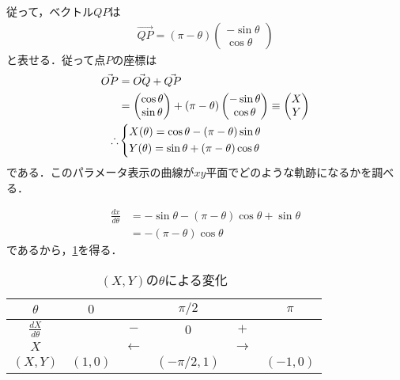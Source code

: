 \documentclass[a4paper,10pt]{ltjsarticle}
\begin{document}
\begin{multicols}{2}
  従って，ベクトル$QP$は
  \begin{align*}
    \vec{QP} = (\pi-\theta)
    \begin{pmatrix}
      -\sin\theta \\
      \cos\theta
    \end{pmatrix}
  \end{align*}
  と表せる．従って点$P$の座標は
  \begin{align}
    \vec{OP}
     & = \vec{OQ} + \vec{QP}       \nonumber           \\
     & =
    \begin{pmatrix}
      \cos\theta \\
      \sin\theta
    \end{pmatrix}
    + (\pi-\theta)
    \begin{pmatrix}
      -\sin\theta \\
      \cos\theta
    \end{pmatrix}
    \equiv
    \begin{pmatrix}
      X \\
      Y
    \end{pmatrix}       \nonumber                      \\
    \therefore
     & \begin{dcases}
         X(\theta) = \cos\theta - (\pi-\theta)\sin\theta \\
         Y(\theta) = \sin\theta + (\pi-\theta)\cos\theta
       \end{dcases}\label{eq:1}
  \end{align}
  である．このパラメータ表示の曲線が$xy$平面でどのような軌跡になるかを調べる．

  \begin{align}
    \frac{dx}{d\theta}
     & = -\sin\theta - (\pi-\theta)\cos\theta + \sin\theta \nonumber \\
     & = -(\pi-\theta) \cos\theta  \label{eq:2}
  \end{align}
  であるから，\cref{table:1}を得る．

  \begin{table}[H]
    \centering
    \caption{$(X,Y)$の$\theta$による変化}
    \label{table:1}
    \begin{tabular}{|c||c|c|c|c|c|}
      \hline\hline
      $\theta$             & $0$     &              & $\pi/2$      &               & $\pi$    \\
      \hline\hline
      $\frac{dX}{d\theta}$ &         & $-$          & $0$          & $+$           &          \\
      \hline
      $X$                  &         & $\leftarrow$ &              & $\rightarrow$ &          \\
      \hline
      $(X,Y)$              & $(1,0)$ &              & $(-\pi/2,1)$ &               & $(-1,0)$ \\
      \hline\hline
    \end{tabular}
  \end{table}


\end{multicols}
\end{document}
